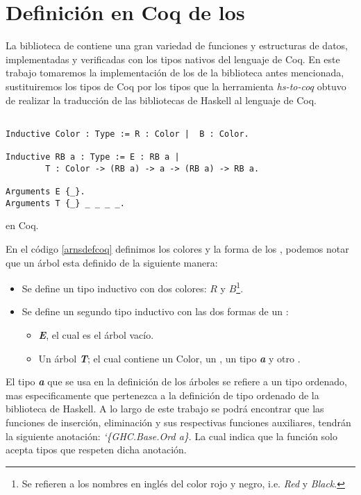 \section{Definici\'on en Coq de los {\arns}}

La biblioteca de {\coq} contiene una gran variedad de funciones y estructuras de datos, 
implementadas y verificadas con los tipos nativos del lenguaje de Coq. En este trabajo
tomaremos la implementaci\'on de los {\arns} de la biblioteca antes mencionada, 
sustituiremos los tipos de Coq por los tipos que la herramienta \textit{hs-to-coq} obtuvo
de realizar la traducci\'on de las bibliotecas de Haskell al lenguaje de Coq.

\begin{listing}[!ht]
\centering
\captionsetup{justification=centering}
\begin{verbatim}

Inductive Color : Type := R : Color |  B : Color.

Inductive RB a : Type := E : RB a |  
        T : Color -> (RB a) -> a -> (RB a) -> RB a.

Arguments E {_}.
Arguments T {_} _ _ _ _.
\end{verbatim}
\caption{{\Arns} en Coq.}
\label{arnsdefcoq}
\end{listing}

En el c\'odigo \ref{arnsdefcoq} definimos los colores y la forma de los {\arns}, podemos notar que un \'arbol esta definido de la siguiente manera:
\begin{itemize}
    \item Se define un tipo inductivo con dos colores: $R$ y $B$\footnote{Se refieren a los nombres en ingl\'es del color rojo y negro, i.e. \textit{Red} y \textit{Black}.}.
    \item Se define un segundo tipo inductivo con las dos formas de un {\arn}:
    \begin{itemize}
        \item \textit{\textbf{E}}, el cual es el \'arbol vacío.
        \item Un \'arbol \textit{\textbf{T}}; el cual contiene un Color, un {\arn}, un tipo \textit{\textbf{a}} y otro {\arn}.
    \end{itemize}
\end{itemize}

El tipo \textit{\textbf{a}} que se usa en la definici\'on de los \'arboles se refiere a 
un tipo ordenado, mas especificamente que pertenezca a la definici\'on de tipo ordenado 
de la biblioteca de Haskell\cite{orderings}. A lo largo de este trabajo se podr\'a 
encontrar que las funciones de inserci\'on, eliminaci\'on y sus respectivas funciones 
auxiliares, tendr\'an la siguiente anotaci\'on: \textit{`\{GHC.Base.Ord a\}}. La cual 
indica que la funci\'on solo acepta tipos que respeten dicha anotaci\'on.

